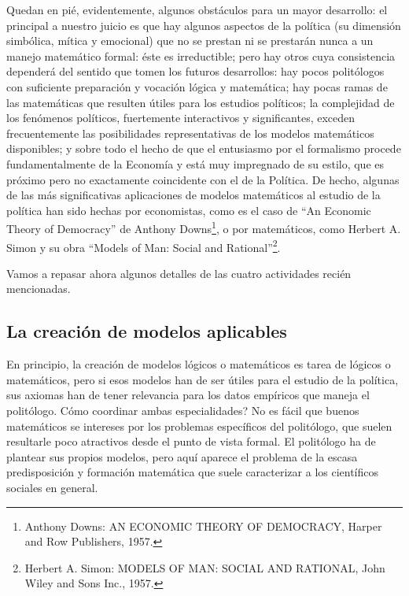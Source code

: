 \documentclass[
]{book}
\begin{document}
Quedan en pié, evidentemente, algunos obstáculos para un mayor desarrollo: el principal a nuestro juicio es que hay algunos aspectos de la política (su dimensión simbólica, mítica y emocional) que no se prestan ni se prestarán nunca a un manejo matemático formal: éste es irreductible; pero hay otros cuya consistencia dependerá del sentido que tomen los futuros desarrollos: hay pocos politólogos con suficiente preparación y vocación lógica y matemática; hay pocas ramas de las matemáticas que resulten útiles para los estudios políticos; la complejidad de los fenómenos políticos, fuertemente interactivos y significantes, exceden frecuentemente las posibilidades representativas de los modelos matemáticos disponibles; y sobre todo el hecho de que el entusiasmo por el formalismo procede fundamentalmente de la Economía y está muy impregnado de su estilo, que es próximo pero no exactamente coincidente con el de la Política. De hecho, algunas de las más significativas aplicaciones de modelos matemáticos al estudio de la política han sido hechas por economistas, como es el caso de ``An Economic Theory of Democracy'' de Anthony Downs\footnote{Anthony Downs: AN ECONOMIC THEORY OF DEMOCRACY, Harper and Row Publishers, 1957.}, o por matemáticos, como Herbert A. Simon y su obra ``Models of Man: Social and Rational''\footnote{Herbert A. Simon: MODELS OF MAN: SOCIAL AND RATIONAL, John Wiley and Sons Inc., 1957.}.

Vamos a repasar ahora algunos detalles de las cuatro actividades recién mencionadas.

\hypertarget{la-creaciuxf3n-de-modelos-aplicables}{%
\subsection*{La creación de modelos aplicables}\label{la-creaciuxf3n-de-modelos-aplicables}}

En principio, la creación de modelos lógicos o matemáticos es tarea de lógicos o matemáticos, pero si esos modelos han de ser útiles para el estudio de la política, sus axiomas han de tener relevancia para los datos empíricos que maneja el politólogo. Cómo coordinar ambas especialidades? No es fácil que buenos matemáticos se intereses por los problemas específicos del politólogo, que suelen resultarle poco atractivos desde el punto de vista formal. El politólogo ha de plantear sus propios modelos, pero aquí aparece el problema de la escasa predisposición y formación matemática que suele caracterizar a los científicos sociales en general.
\end{document}
